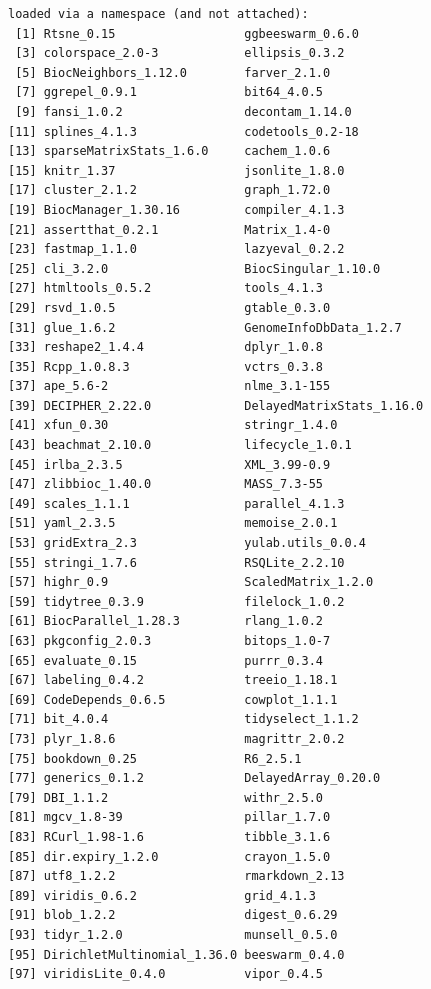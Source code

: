 \documentclass[
]{book}
\begin{document}
\begin{verbatim}
loaded via a namespace (and not attached):
 [1] Rtsne_0.15                  ggbeeswarm_0.6.0           
 [3] colorspace_2.0-3            ellipsis_0.3.2             
 [5] BiocNeighbors_1.12.0        farver_2.1.0               
 [7] ggrepel_0.9.1               bit64_4.0.5                
 [9] fansi_1.0.2                 decontam_1.14.0            
[11] splines_4.1.3               codetools_0.2-18           
[13] sparseMatrixStats_1.6.0     cachem_1.0.6               
[15] knitr_1.37                  jsonlite_1.8.0             
[17] cluster_2.1.2               graph_1.72.0               
[19] BiocManager_1.30.16         compiler_4.1.3             
[21] assertthat_0.2.1            Matrix_1.4-0               
[23] fastmap_1.1.0               lazyeval_0.2.2             
[25] cli_3.2.0                   BiocSingular_1.10.0        
[27] htmltools_0.5.2             tools_4.1.3                
[29] rsvd_1.0.5                  gtable_0.3.0               
[31] glue_1.6.2                  GenomeInfoDbData_1.2.7     
[33] reshape2_1.4.4              dplyr_1.0.8                
[35] Rcpp_1.0.8.3                vctrs_0.3.8                
[37] ape_5.6-2                   nlme_3.1-155               
[39] DECIPHER_2.22.0             DelayedMatrixStats_1.16.0  
[41] xfun_0.30                   stringr_1.4.0              
[43] beachmat_2.10.0             lifecycle_1.0.1            
[45] irlba_2.3.5                 XML_3.99-0.9               
[47] zlibbioc_1.40.0             MASS_7.3-55                
[49] scales_1.1.1                parallel_4.1.3             
[51] yaml_2.3.5                  memoise_2.0.1              
[53] gridExtra_2.3               yulab.utils_0.0.4          
[55] stringi_1.7.6               RSQLite_2.2.10             
[57] highr_0.9                   ScaledMatrix_1.2.0         
[59] tidytree_0.3.9              filelock_1.0.2             
[61] BiocParallel_1.28.3         rlang_1.0.2                
[63] pkgconfig_2.0.3             bitops_1.0-7               
[65] evaluate_0.15               purrr_0.3.4                
[67] labeling_0.4.2              treeio_1.18.1              
[69] CodeDepends_0.6.5           cowplot_1.1.1              
[71] bit_4.0.4                   tidyselect_1.1.2           
[73] plyr_1.8.6                  magrittr_2.0.2             
[75] bookdown_0.25               R6_2.5.1                   
[77] generics_0.1.2              DelayedArray_0.20.0        
[79] DBI_1.1.2                   withr_2.5.0                
[81] mgcv_1.8-39                 pillar_1.7.0               
[83] RCurl_1.98-1.6              tibble_3.1.6               
[85] dir.expiry_1.2.0            crayon_1.5.0               
[87] utf8_1.2.2                  rmarkdown_2.13             
[89] viridis_0.6.2               grid_4.1.3                 
[91] blob_1.2.2                  digest_0.6.29              
[93] tidyr_1.2.0                 munsell_0.5.0              
[95] DirichletMultinomial_1.36.0 beeswarm_0.4.0             
[97] viridisLite_0.4.0           vipor_0.4.5                
\end{verbatim}
\end{document}
